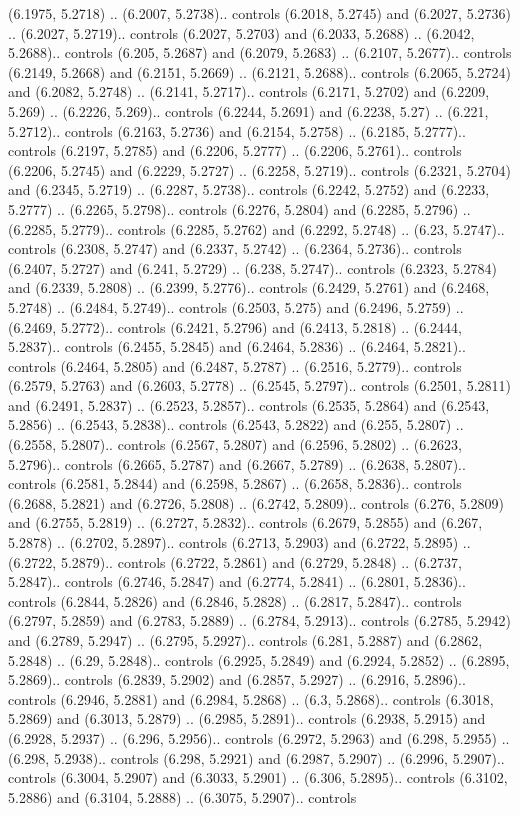 (6.1975, 5.2718) .. (6.2007, 5.2738).. controls (6.2018, 5.2745) and (6.2027, 5.2736) .. (6.2027, 5.2719).. controls (6.2027, 5.2703) and (6.2033, 5.2688) .. (6.2042, 5.2688).. controls (6.205, 5.2687) and (6.2079, 5.2683) .. (6.2107, 5.2677).. controls (6.2149, 5.2668) and (6.2151, 5.2669) .. (6.2121, 5.2688).. controls (6.2065, 5.2724) and (6.2082, 5.2748) .. (6.2141, 5.2717).. controls (6.2171, 5.2702) and (6.2209, 5.269) .. (6.2226, 5.269).. controls (6.2244, 5.2691) and (6.2238, 5.27) .. (6.221, 5.2712).. controls (6.2163, 5.2736) and (6.2154, 5.2758) .. (6.2185, 5.2777).. controls (6.2197, 5.2785) and (6.2206, 5.2777) .. (6.2206, 5.2761).. controls (6.2206, 5.2745) and (6.2229, 5.2727) .. (6.2258, 5.2719).. controls (6.2321, 5.2704) and (6.2345, 5.2719) .. (6.2287, 5.2738).. controls (6.2242, 5.2752) and (6.2233, 5.2777) .. (6.2265, 5.2798).. controls (6.2276, 5.2804) and (6.2285, 5.2796) .. (6.2285, 5.2779).. controls (6.2285, 5.2762) and (6.2292, 5.2748) .. (6.23, 5.2747).. controls (6.2308, 5.2747) and (6.2337, 5.2742) .. (6.2364, 5.2736).. controls (6.2407, 5.2727) and (6.241, 5.2729) .. (6.238, 5.2747).. controls (6.2323, 5.2784) and (6.2339, 5.2808) .. (6.2399, 5.2776).. controls (6.2429, 5.2761) and (6.2468, 5.2748) .. (6.2484, 5.2749).. controls (6.2503, 5.275) and (6.2496, 5.2759) .. (6.2469, 5.2772).. controls (6.2421, 5.2796) and (6.2413, 5.2818) .. (6.2444, 5.2837).. controls (6.2455, 5.2845) and (6.2464, 5.2836) .. (6.2464, 5.2821).. controls (6.2464, 5.2805) and (6.2487, 5.2787) .. (6.2516, 5.2779).. controls (6.2579, 5.2763) and (6.2603, 5.2778) .. (6.2545, 5.2797).. controls (6.2501, 5.2811) and (6.2491, 5.2837) .. (6.2523, 5.2857).. controls (6.2535, 5.2864) and (6.2543, 5.2856) .. (6.2543, 5.2838).. controls (6.2543, 5.2822) and (6.255, 5.2807) .. (6.2558, 5.2807).. controls (6.2567, 5.2807) and (6.2596, 5.2802) .. (6.2623, 5.2796).. controls (6.2665, 5.2787) and (6.2667, 5.2789) .. (6.2638, 5.2807).. controls (6.2581, 5.2844) and (6.2598, 5.2867) .. (6.2658, 5.2836).. controls (6.2688, 5.2821) and (6.2726, 5.2808) .. (6.2742, 5.2809).. controls (6.276, 5.2809) and (6.2755, 5.2819) .. (6.2727, 5.2832).. controls (6.2679, 5.2855) and (6.267, 5.2878) .. (6.2702, 5.2897).. controls (6.2713, 5.2903) and (6.2722, 5.2895) .. (6.2722, 5.2879).. controls (6.2722, 5.2861) and (6.2729, 5.2848) .. (6.2737, 5.2847).. controls (6.2746, 5.2847) and (6.2774, 5.2841) .. (6.2801, 5.2836).. controls (6.2844, 5.2826) and (6.2846, 5.2828) .. (6.2817, 5.2847).. controls (6.2797, 5.2859) and (6.2783, 5.2889) .. (6.2784, 5.2913).. controls (6.2785, 5.2942) and (6.2789, 5.2947) .. (6.2795, 5.2927).. controls (6.281, 5.2887) and (6.2862, 5.2848) .. (6.29, 5.2848).. controls (6.2925, 5.2849) and (6.2924, 5.2852) .. (6.2895, 5.2869).. controls (6.2839, 5.2902) and (6.2857, 5.2927) .. (6.2916, 5.2896).. controls (6.2946, 5.2881) and (6.2984, 5.2868) .. (6.3, 5.2868).. controls (6.3018, 5.2869) and (6.3013, 5.2879) .. (6.2985, 5.2891).. controls (6.2938, 5.2915) and (6.2928, 5.2937) .. (6.296, 5.2956).. controls (6.2972, 5.2963) and (6.298, 5.2955) .. (6.298, 5.2938).. controls (6.298, 5.2921) and (6.2987, 5.2907) .. (6.2996, 5.2907).. controls (6.3004, 5.2907) and (6.3033, 5.2901) .. (6.306, 5.2895).. controls (6.3102, 5.2886) and (6.3104, 5.2888) .. (6.3075, 5.2907).. controls 